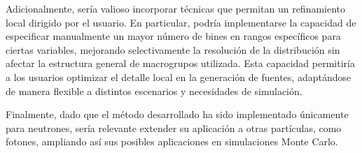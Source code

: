Adicionalmente, sería valioso incorporar técnicas que permitan un refinamiento local dirigido por el usuario. En particular, podría implementarse la capacidad de especificar manualmente un mayor número de bines en rangos específicos para ciertas variables, mejorando selectivamente la resolución de la distribución sin afectar la estructura general de macrogrupos utilizada. Esta capacidad permitiría a los usuarios optimizar el detalle local en la generación de fuentes, adaptándose de manera flexible a distintos escenarios y necesidades de simulación.

Finalmente, dado que el método desarrollado ha sido implementado únicamente para neutrones, sería relevante extender su aplicación a otras partículas, como fotones, ampliando así sus posibles aplicaciones en simulaciones Monte Carlo.
